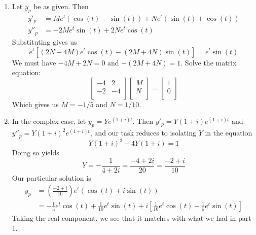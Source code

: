 \documentclass[a4paper]{article}
\begin{document}
\begin{enumerate}[label=\arabic*.]
	\item Let \( y_{p } \) be as given. Then
	\begin{align*}
		y'_{p } & = Me^{t} \!\left( \cos\!\left(t \right) - \sin\!\left(t \right)  \right) + Ne^{t} \!\left( \sin\!\left(t \right) + \cos\!\left(t\right)  \right)  \\
		y''_{p} & = -2Me^{t} \sin\!\left(t \right) + 2Ne^{t} \cos\!\left(t\right) 
	\end{align*}
	Substituting gives us
	\[
		e^{t } \!\left[ \!\left( 2N - 4M \right)e^{t }\cos\!\left(t \right) - \!\left( 2M + 4N \right)\sin\!\left(t\right) \right] = e^{t }\sin\!\left(t\right) 
	\]
	We must have \( -4M + 2N = 0 \) and \( -\!\left( 2M + 4N \right) = 1 \). Solve the matrix equation:
	\[
		\begin{bmatrix}
			-4 & 2\\
			-2 & -4\\
		\end{bmatrix}
		\begin{bmatrix}
			M \\
			N \\
		\end{bmatrix} = 
		\begin{bmatrix}
			1 \\
			0 \\
		\end{bmatrix}
	\]
	Which gives us \( M = -1/5 \) and \( N = 1/10 \).
	\item In the complex case, let \( y_{p } = Ye^{\!\left( 1 + i  \right)t} \). Then \( y'_{p } = Y \!\left( 1 + i  \right)e^{\!\left( 1 + i  \right)t } \) and \( y''_{p } = Y \!\left( 1 + i  \right)^{2}e^{\!\left( 1 + i  \right)t } \), and our task reduces to isolating \( Y  \) in the equation
	\[
		Y \!\left( 1 + i  \right)^{2} - 4Y \!\left( 1 + i  \right) = 1 
	\]
	Doing so yields
	\[
		Y = -\frac{1}{4 + 2i} = \frac{-4 + 2i}{20} = \frac{-2 + i }{10}
	\]
	Our particular solution is
	\begin{align*}
		y_{p } & = \!\left( \frac{-2 + i}{10} \right) e^{t} \!\left( \cos\!\left(t \right) + i \sin\!\left(t\right)  \right) \\
		       & = -\frac{1}{5} e^{t }\cos\!\left(t \right) + \frac{1}{10}e^{t }\sin\!\left(t \right) + i \!\left[ \frac{1}{10}e^{t }\cos\!\left(t \right) - \frac{1}{5}e^{t }\sin\!\left(t\right)  \right]
	\end{align*}
	Taking the real component, we see that it matches with what we had in part 1.
\end{enumerate}
\end{document}
